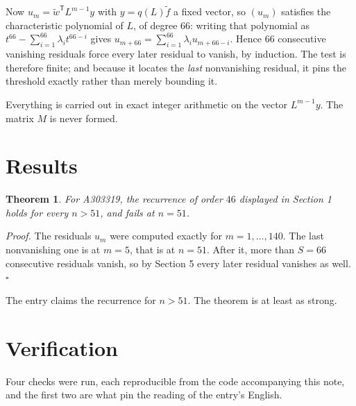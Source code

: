 \documentclass[11pt]{article}
\newtheorem{theorem}{Theorem}
\theoremstyle{definition}
\begin{document}
Now $u_m = \tilde w^{\mathsf T} L^{m-1} y$ with $y = q(L)\tilde f$ a fixed vector, so $(u_m)$ satisfies the characteristic polynomial of $L$, of degree $66$: writing that polynomial as $t^{66} - \sum_{i=1}^{66} \lambda_i t^{66-i}$ gives $u_{m+66} = \sum_{i=1}^{66} \lambda_i u_{m+66-i}$. Hence $66$ consecutive vanishing residuals force every later residual to vanish, by induction. The test is therefore finite; and because it locates the {\itshape last} nonvanishing residual, it pins the threshold exactly rather than merely bounding it.

Everything is carried out in exact integer arithmetic on the vector $L^{m-1}y$. The matrix $M$ is never formed.

\section{Results}

\begin{theorem} For A303319, the recurrence of order $46$ displayed in Section 1 holds for every $n > 51$, and fails at $n = 51$.\end{theorem}

{\itshape Proof.} The residuals $u_m$ were computed exactly for $m = 1,\dots,140$. The last nonvanishing one is at $m = 5$, that is at $n = 51$. After it, more than $S = 66$ consecutive residuals vanish, so by Section 5 every later residual vanishes as well. $\square$

The entry claims the recurrence for $n > 51$. The theorem is at least as strong.

\section{Verification}

Four checks were run, each reproducible from the code accompanying this note, and the first two are what pin the reading of the entry's English.
\end{document}

